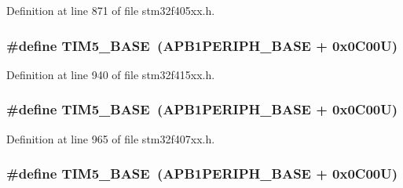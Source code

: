 Definition at line 871 of file stm32f405xx.\+h.

\subsubsection[{\texorpdfstring{T\+I\+M5\+\_\+\+B\+A\+SE}{TIM5_BASE}}]{\setlength{\rightskip}{0pt plus 5cm}\#define T\+I\+M5\+\_\+\+B\+A\+SE~({\bf A\+P\+B1\+P\+E\+R\+I\+P\+H\+\_\+\+B\+A\+SE} + 0x0\+C00\+U)}\hypertarget{group___peripheral__registers__structures_ga3e1671477190d065ba7c944558336d7e}{}\label{group___peripheral__registers__structures_ga3e1671477190d065ba7c944558336d7e}


Definition at line 940 of file stm32f415xx.\+h.

\subsubsection[{\texorpdfstring{T\+I\+M5\+\_\+\+B\+A\+SE}{TIM5_BASE}}]{\setlength{\rightskip}{0pt plus 5cm}\#define T\+I\+M5\+\_\+\+B\+A\+SE~({\bf A\+P\+B1\+P\+E\+R\+I\+P\+H\+\_\+\+B\+A\+SE} + 0x0\+C00\+U)}\hypertarget{group___peripheral__registers__structures_ga3e1671477190d065ba7c944558336d7e}{}\label{group___peripheral__registers__structures_ga3e1671477190d065ba7c944558336d7e}


Definition at line 965 of file stm32f407xx.\+h.

\subsubsection[{\texorpdfstring{T\+I\+M5\+\_\+\+B\+A\+SE}{TIM5_BASE}}]{\setlength{\rightskip}{0pt plus 5cm}\#define T\+I\+M5\+\_\+\+B\+A\+SE~({\bf A\+P\+B1\+P\+E\+R\+I\+P\+H\+\_\+\+B\+A\+SE} + 0x0\+C00\+U)}\hypertarget{group___peripheral__registers__structures_ga3e1671477190d065ba7c944558336d7e}{}\label{group___peripheral__registers__structures_ga3e1671477190d065ba7c944558336d7e}


